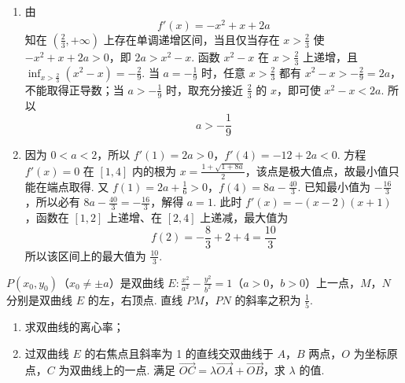 \begin{solution}
\begin{enumerate}
\item 由
\[
f'(x)=-x^2+x+2a
\]
知在 \(\left(\frac{2}{3},+\infty\right)\) 上存在单调递增区间，当且仅当存在
\(x>\frac{2}{3}\) 使 \(-x^2+x+2a>0\)，即
\(2a>x^2-x\). 函数 \(x^2-x\) 在 \(x>\frac{2}{3}\) 上递增，且
\(\inf_{x>\frac{2}{3}}(x^2-x)=-\frac{2}{9}\). 当 \(a=-\frac{1}{9}\) 时，任意
\(x>\frac{2}{3}\) 都有 \(x^2-x>-\frac{2}{9}=2a\)，不能取得正导数；当
\(a>-\frac{1}{9}\) 时，取充分接近 \(\frac{2}{3}\) 的 \(x\)，即可使
\(x^2-x<2a\). 所以
\[
a>-\frac{1}{9}
\]

\item 因为 \(0<a<2\)，所以
\(f'(1)=2a>0\)，\(f'(4)=-12+2a<0\). 方程 \(f'(x)=0\) 在 \([1,4]\) 内的根为
\(x=\frac{1+\sqrt{1+8a}}{2}\)，该点是极大值点，故最小值只能在端点取得. 又
\(f(1)=2a+\frac{1}{6}>0\)，\(f(4)=8a-\frac{40}{3}\).
已知最小值为 \(-\frac{16}{3}\)，所以必有
\(8a-\frac{40}{3}=-\frac{16}{3}\)，解得 \(a=1\). 此时
\(f'(x)=-(x-2)(x+1)\)，函数在 \([1,2]\) 上递增、在 \([2,4]\) 上递减，最大值为
\[
f(2)=-\frac{8}{3}+2+4=\frac{10}{3}
\]
所以该区间上的最大值为 \(\frac{10}{3}\).
\end{enumerate}
\end{solution}

\begin{problem}
\(P(x_0, y_0)\)（\(x_0 \neq \pm a\)）是双曲线 \(E: \frac{x^2}{a^2} - \frac{y^2}{b^2} = 1\)（\(a > 0\)，\(b > 0\)）上一点，\(M\)，\(N\) 分别是双曲线 \(E\) 的左，右顶点. 直线 \(PM\)，\(PN\) 的斜率之积为 \(\frac{1}{5}\).
\begin{enumerate}
\item 求双曲线的离心率；
\item 过双曲线 \(E\) 的右焦点且斜率为 1 的直线交双曲线于 \(A\)，\(B\) 两点，\(O\) 为坐标原点，\(C\) 为双曲线上的一点. 满足 \(\overrightarrow{OC} = \lambda \overrightarrow{OA} + \overrightarrow{OB}\)，求 \(\lambda\) 的值.
\end{enumerate}
\end{problem}

